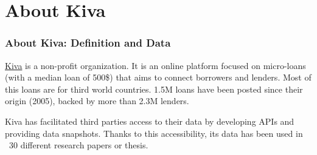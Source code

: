 \documentclass{beamer}
\begin{document}
\section{About Kiva} 
\begin{frame}\frametitle{About Kiva: Definition and Data}
\footnotesize{
\href{https://www.kiva.org}{Kiva} is a non-profit organization. It is an online platform focused on micro-loans (with a median loan of 500\$) that aims to connect borrowers and lenders. Most of this loans are for third world countries. 1.5M loans have been posted since their origin (2005), backed by more than 2.3M lenders.  \par
\vspace{0.5cm}
Kiva has facilitated third parties access to their data by developing APIs and providing data snapshots. Thanks to this accessibility, its data has been used in ~30 different research papers or thesis.}

\end{frame}
\end{document}
